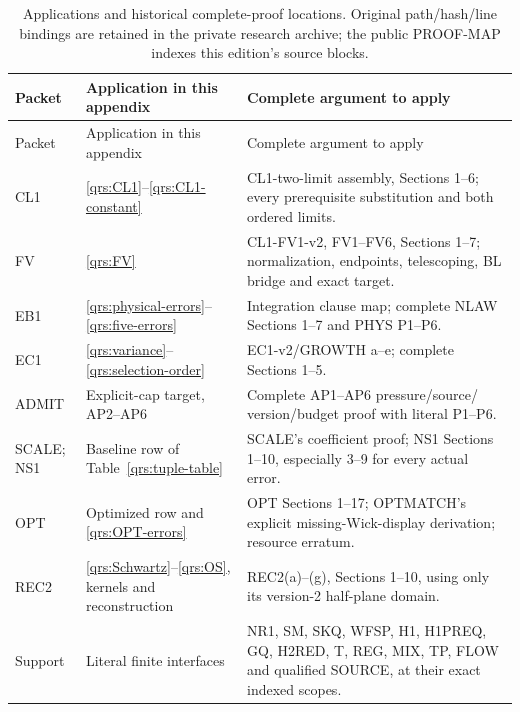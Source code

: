 \documentclass[11pt]{article}
\theoremstyle{plain}
\theoremstyle{definition}
\theoremstyle{remark}
\begin{document}
\clearpage
\begin{longtable}{@{}p{}p{}p{}@{}}
\caption{Applications and historical complete-proof locations. Original
path/hash/line bindings are retained in the private research archive; the
public PROOF-MAP indexes this edition's source blocks.}\label{qrs:proof-table}\\
\toprule
Packet & Application in this appendix & Complete argument to apply\\
\midrule
\endfirsthead
\toprule Packet & Application in this appendix & Complete argument to apply\\
\midrule\endhead
CL1 & \eqref{qrs:CL1}--\eqref{qrs:CL1-constant} & CL1-two-limit assembly,
Sections 1--6; every prerequisite substitution and both ordered limits.\\
FV & \eqref{qrs:FV} & CL1-FV1-v2, FV1--FV6, Sections 1--7;
normalization, endpoints, telescoping, BL bridge and exact target.\\
EB1 & \eqref{qrs:physical-errors}--\eqref{qrs:five-errors} & Integration
clause map; complete NLAW Sections 1--7 and PHYS P1--P6.\\
EC1 & \eqref{qrs:variance}--\eqref{qrs:selection-order} & EC1-v2/GROWTH
a--e; complete Sections 1--5.\\
ADMIT & Explicit-cap target, AP2--AP6 & Complete AP1--AP6 pressure/source/
version/budget proof with literal P1--P6.\\
SCALE; NS1 & Baseline row of Table~\ref{qrs:tuple-table} & SCALE's coefficient
proof; NS1 Sections 1--10, especially 3--9 for every actual error.\\
OPT & Optimized row and \eqref{qrs:OPT-errors} & OPT Sections 1--17;
OPTMATCH's explicit missing-Wick-display derivation; resource erratum.\\
REC2 & \eqref{qrs:Schwartz}--\eqref{qrs:OS}, kernels and reconstruction &
REC2(a)--(g), Sections 1--10, using only its version-2 half-plane domain.\\
Support & Literal finite interfaces & NR1, SM, SKQ, WFSP, H1, H1PREQ,
GQ, H2RED, T, REG, MIX, TP, FLOW and qualified SOURCE, at their exact
indexed scopes.\\
\bottomrule
\end{longtable}

\clearpage

\clearpage
\end{document}
